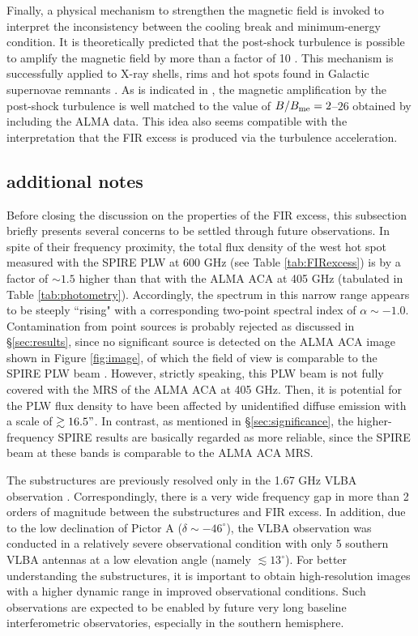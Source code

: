 \documentclass[twocolumn]{aastex631}
\begin{document}
Finally, a physical mechanism to strengthen the magnetic field 
is invoked to interpret the inconsistency 
between the cooling break and minimum-energy condition.
It is theoretically predicted that 
the post-shock turbulence is possible to 
amplify the magnetic field by more than a factor of 10
\citep[e.g.,][]{inoue2009,mizuno2011}. 
This mechanism is successfully applied to X-ray shells, 
rims and hot spots found in Galactic supernovae remnants 
\citep[e.g.,][]{bamba2003,uchiyama2007}.
As is indicated in \citet{isobe2020},
the magnetic amplification by the post-shock turbulence is 
well matched to the value of $B/B_{\rm me} = 2$--$26$ 
obtained by including the ALMA data.
This idea also seems compatible with the interpretation 
that the FIR excess is produced via the turbulence acceleration.

\subsection{additional notes}
\label{sec:notes}
Before closing the discussion on the properties of the FIR excess,
this subsection briefly presents several concerns
to be settled through future observations.
In spite of their frequency proximity,
the total flux density of the west hot spot 
measured with the SPIRE PLW at 600 GHz (see Table \ref{tab:FIRexcess})
is by a factor of $\sim 1.5$ higher than 
that with the ALMA ACA at 405 GHz (tabulated in Table \ref{tab:photometry}).
Accordingly, the spectrum in this narrow range 
appears to be steeply ``rising" 
with a corresponding two-point spectral index of $\alpha \sim -1.0$.
Contamination from point sources is probably rejected
as discussed in \S \ref{sec:results},
since no significant source is detected 
on the ALMA ACA image shown in Figure \ref{fig:image},
of which the field of view is comparable to the SPIRE PLW beam
\citep[the FWHM size of $35.2"$;][]{griffin2013}.
However, strictly speaking, this PLW beam 
is not fully covered with the MRS of the ALMA ACA at 405 GHz.
Then, it is potential for the PLW flux density 
to have been affected by unidentified diffuse emission 
with a scale of $\gtrsim 16.5"$.
In contrast, as mentioned in \S \ref{sec:significance},
the higher-frequency SPIRE results 
are basically regarded as more reliable, 
since the SPIRE beam at these bands is comparable to 
the ALMA ACA MRS.

The substructures are previously resolved 
only in the 1.67 GHz VLBA observation \citep{tingay2008}.
Correspondingly, there is a very wide frequency gap 
in more than 2 orders of magnitude between the substructures and FIR excess. 
In addition, 
due to the low declination of Pictor A ($\delta\sim-46^\circ$),
the VLBA observation was conducted 
in a relatively severe observational condition 
with only 5 southern VLBA antennas 
at a low elevation angle (namely $\lesssim 13^\circ$).
For better understanding the substructures,
it is important to obtain high-resolution images 
with a higher dynamic range in improved observational conditions. 
Such observations are expected to be enabled 
by future very long baseline interferometric observatories,
especially in the southern hemisphere.
\end{document}
